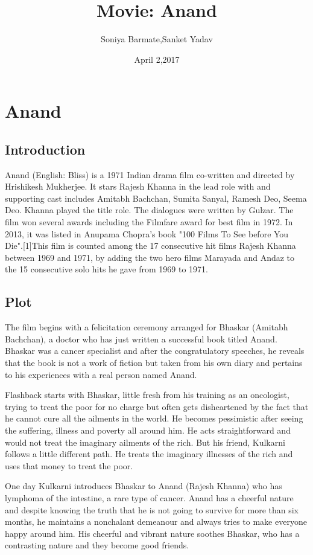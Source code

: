 \documentclass[11pt]{article}
\begin{document}
 

\title{Movie: Anand}
\author{Soniya Barmate,Sanket Yadav}
\date{April 2,2017}
\maketitle
\section*{Anand}
\subsection*{Introduction}
Anand (English: Bliss) is a 1971 Indian drama film co-written and directed by Hrishikesh Mukherjee.
It stars Rajesh Khanna in the lead role with and supporting cast includes Amitabh Bachchan, Sumita Sanyal, 
Ramesh Deo, Seema Deo. Khanna played the title role. The dialogues were written by Gulzar. The film won 
several awards including the Filmfare award for best film in 1972. In 2013, it was listed in Anupama Chopra's
book "100 Films To See before You Die".[1]This film is counted among the 17 consecutive hit films Rajesh Khanna
between 1969 and 1971, by adding the two hero films Marayada and Andaz to the 15 consecutive solo hits he gave 
from 1969 to 1971.
\subsection*{Plot}
The film begins with a felicitation ceremony arranged for Bhaskar (Amitabh Bachchan), a doctor who has just 
written a successful book titled Anand. Bhaskar was a cancer specialist and after the congratulatory 
speeches, he reveals that the book is not a work of fiction but taken from his own diary and pertains
to his experiences with a real person named Anand.

Flashback starts with Bhaskar, little fresh from his training as an oncologist, trying to treat the 
poor for no charge but often gets disheartened by the fact that he cannot cure all the ailments in
the world. He becomes pessimistic after seeing the suffering, illness and poverty all around him.
He acts straightforward and would not treat the imaginary ailments of the rich. But his friend,
Kulkarni follows a little different path. He treats the imaginary illnesses of the rich and uses
that money to treat the poor.

One day Kulkarni introduces Bhaskar to Anand (Rajesh Khanna) who has lymphoma of the intestine, 
a rare type of cancer. Anand has a cheerful nature and despite knowing the truth that he is not
going to survive for more than six months, he maintains a nonchalant demeanour and always tries
to make everyone happy around him. His cheerful and vibrant nature soothes Bhaskar, who has a 
contrasting nature and they become good friends.
\end{document}
